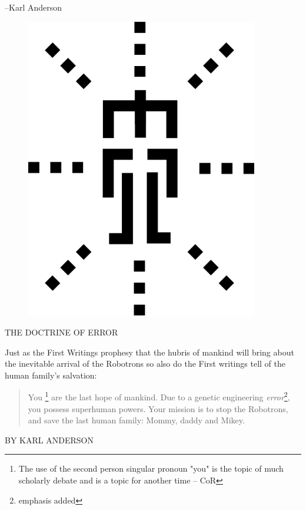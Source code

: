 \documentclass{amsbook}
\begin{document}
--Karl Anderson

\clearpage

\begin{figure}
  \includegraphics[width=4in]{mcor-logo11.png}
\end{figure}

\vskip 72pt

\clearpage
\vskip 72pt
{\ROBOFONTx   THE DOCTRINE OF ERROR}

\vskip 36pt

Just as the First Writings prophesy that the hubris of mankind will
bring about the inevitable arrival of the Robotrons so also do the
First writings tell of the human family's salvation:

\begin{quotation}
You \footnote{The use of the second person singular pronoun "you" is the topic
of much scholarly debate and is a topic for another time -- CoR} are
the last hope of mankind. Due to a genetic engineering {\em error}\footnote{
emphasis added}, you possess superhuman powers. Your mission is to
stop the Robotrons, and save the last human family: Mommy, daddy and
Mikey.
\end{quotation}

\clearpage

\vskip 36pt
{\ROBOFONTx BY KARL ANDERSON}
\vskip 36pt
\end{document}
